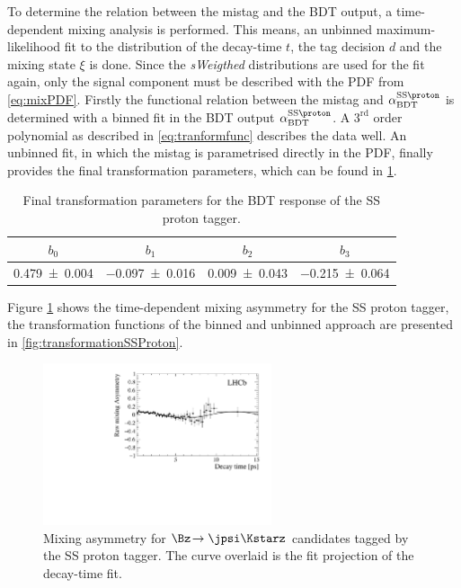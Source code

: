 To determine the relation between the mistag and the BDT output, a time-dependent mixing analysis is performed.
This means, an unbinned maximum-likelihood fit to the distribution of the decay-time $t$, the tag decision $d$ and the mixing state $\xi$ is done.
Since the \emph{sWeigthed} distributions are used for the fit again, only the signal component must be described with the PDF from \cref{eq:mixPDF}.
Firstly the functional relation between the mistag and $\alpha^{\text{SS}\proton}_\text{BDT}$ is determined with a binned fit in the BDT output $\alpha^{\text{SS}\proton}_\text{BDT}$.
A $3^{\text{rd}}$ order polynomial as described in \cref{eq:tranformfunc} describes the data well.
An unbinned fit, in which the mistag is parametrised directly in the PDF, finally provides the final transformation parameters, which can be found in \cref{tab:transformSSProton}.
\begin{table}[tbp]
	\centering
	\caption{Final transformation parameters for the BDT response of the SS proton tagger.}
	\begin{tabular}{cccc}
		\toprule
		$b_0$ & $b_1$ & $b_2$ & $b_3$ \\
		\midrule
		\num{0.479\pm0.004} & \num{-0.097\pm0.016} & \num{0.009\pm0.043} & \num{-0.215\pm0.064} \\
		\bottomrule
	\end{tabular}
	\label{tab:transformSSProton}
\end{table}
Figure \ref{fig:MixasymmetrieSSProton} shows the time-dependent mixing asymmetry for the SS proton tagger, the transformation functions of the binned and unbinned approach are presented in \cref{fig:transformationSSProton}.
\begin{figure}[tbp]
	\begin{center}
		\includegraphics[width=0.6\textwidth]{09FlavourTagging/figs/Asymmetry_SSProton.pdf}
	\end{center}
	\caption{Mixing asymmetry for $\Bz\!\to\jpsi\Kstarz$ candidates tagged by the SS proton tagger.
	The curve overlaid is the fit projection of the decay-time fit.}
	\label{fig:MixasymmetrieSSProton}
\end{figure}
